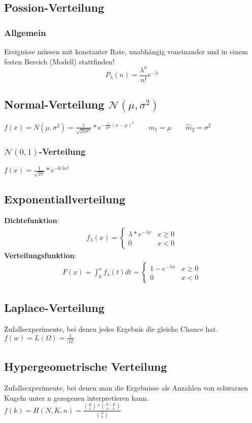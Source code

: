 \documentclass{article}
\begin{document}
\subsection{Possion-Verteilung}
\subsubsection{Allgemein}
Ereignisse m\"ussen mit konstanter Rate, unabh\"angig voneinander und in einem festen 
Bereich (Modell) stattfinden!
\[
	P_{\lambda}(n) = \frac{\lambda ^n}{n!} e ^{- \lambda}
\]
\subsection{Normal-Verteilung $\mathcal{N}(\mu, \sigma^2)$}
$f(x) = N(\mu, \sigma^2) = \frac{1}{\sqrt{2\pi\sigma^2}}*e^{-\frac{1}{2\sigma^2}(x-		
\mu)^2} \quad \quad m_1 = \mu \quad \quad \widehat{m}_2=\sigma^2$
\subsubsection{$\mathcal{N}(0,1)$-Verteilung}
$f(x) = \frac{1}{\sqrt{2\pi}}*e^{-0.5x^2}$
\subsection{Exponentiallverteilung}
\textbf{Dichtefunktion}:
\begin{align} f_\lambda(x) =
	\begin{cases}
		\lambda*e^{-\lambda x} & x \geq 0 \\
		0                                     & x <    0
	\end{cases}
\end{align}
\textbf{Verteilungsfunktion}:
\begin{align} F(x) = \int_0^x f_\lambda(t) dt =
	\begin{cases}
		1 - e^{-\lambda x} & x \geq 0 \\
		0                                     & x <    0
	\end{cases}
\end{align}
\subsection{Laplace-Verteilung}
Zufallsexperimente, bei denen jedes Ergebnis die gleiche Chance hat. \\
$f(w) = L(\Omega) = \frac{1}{|\Omega|}$
\subsection{Hypergeometrische Verteilung}
Zufallsexperimente, bei denen man die Ergebnisse als Anzahlen von schwarzen Kugeln unter 	n gezogenen interpretieren kann. \\
$f(k) = H(N, K, n) = \frac{\binom{K}{k}*\binom{N-K}{n-k}}{\binom{N}{n}}$
\end{document}
